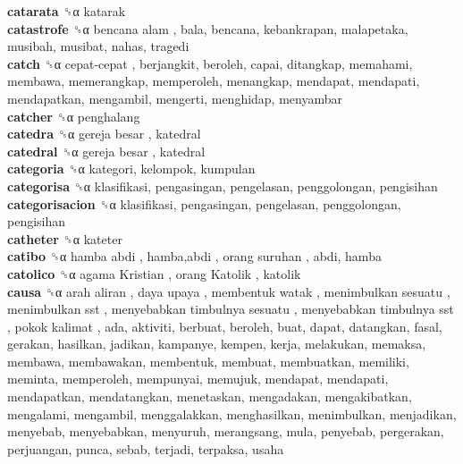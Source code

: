 \textbf{catarata} ␝α  katarak  \\
\textbf{catastrofe} ␝α   bencana alam , bala, bencana, kebankrapan, malapetaka, musibah, musibat, nahas, tragedi  \\
\textbf{catch} ␝α   cepat-cepat , berjangkit, beroleh, capai, ditangkap, memahami, membawa, memerangkap, memperoleh, menangkap, mendapat, mendapati, mendapatkan, mengambil, mengerti, menghidap, menyambar  \\
\textbf{catcher} ␝α  penghalang  \\
\textbf{catedra} ␝α   gereja besar , katedral  \\
\textbf{catedral} ␝α   gereja besar , katedral  \\
\textbf{categoria} ␝α  kategori, kelompok, kumpulan  \\
\textbf{categorisa} ␝α  klasifikasi, pengasingan, pengelasan, penggolongan, pengisihan  \\
\textbf{categorisacion} ␝α  klasifikasi, pengasingan, pengelasan, penggolongan, pengisihan  \\
\textbf{catheter} ␝α  kateter  \\
\textbf{catibo} ␝α   hamba abdi ,  hamba,abdi ,  orang suruhan , abdi, hamba  \\
\textbf{catolico} ␝α   agama Kristian ,  orang Katolik , katolik  \\
\textbf{causa} ␝α   arah aliran ,  daya upaya ,  membentuk watak ,  menimbulkan sesuatu ,  menimbulkan sst ,  menyebabkan timbulnya sesuatu ,  menyebabkan timbulnya sst ,  pokok kalimat , ada, aktiviti, berbuat, beroleh, buat, dapat, datangkan, fasal, gerakan, hasilkan, jadikan, kampanye, kempen, kerja, melakukan, memaksa, membawa, membawakan, membentuk, membuat, membuatkan, memiliki, meminta, memperoleh, mempunyai, memujuk, mendapat, mendapati, mendapatkan, mendatangkan, menetaskan, mengadakan, mengakibatkan, mengalami, mengambil, menggalakkan, menghasilkan, menimbulkan, menjadikan, menyebab, menyebabkan, menyuruh, merangsang, mula, penyebab, pergerakan, perjuangan, punca, sebab, terjadi, terpaksa, usaha  \\
